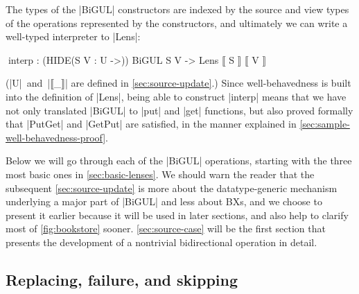 \documentclass{sigplanconf}
\begin{document}
The types of the |BiGUL| constructors are indexed by the source and view types of the operations represented by the constructors, and ultimately we can write a well-typed interpreter to |Lens|:
\begin{code}
^^^interp : (HIDE({S V : U} ->)) BiGUL S V -> Lens ⟦ S ⟧ ⟦ V ⟧
\end{code}
(|U|~and~|⟦_⟧| are defined in \autoref{sec:source-update}.)
Since well-behavedness is built into the definition of |Lens|, being able to construct |interp| means that we have not only translated |BiGUL| to |put| and |get| functions, but also proved formally that |PutGet| and |GetPut| are satisfied, in the manner explained in \autoref{sec:sample-well-behavedness-proof}.

Below we will go through each of the |BiGUL| operations, starting with the three most basic ones in \autoref{sec:basic-lenses}.
We should warn the reader that the subsequent \autoref{sec:source-update} is more about the datatype-generic mechanism underlying a major part of |BiGUL| and less about BXs, and we choose to present it earlier because it will be used in later sections, and also help to clarify most of \autoref{fig:bookstore} sooner.
\autoref{sec:source-case} will be the first section that presents the development of a nontrivial bidirectional operation in detail.


\subsection{Replacing, failure, and skipping}
\label{sec:basic-lenses}
\end{document}
